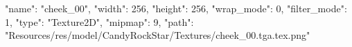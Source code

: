 {
  "name": "cheek_00",
  "width": 256,
  "height": 256,
  "wrap_mode": 0,
  "filter_mode": 1,
  "type": "Texture2D",
  "mipmap": 9,
  "path": "Resources/res/model/CandyRockStar/Textures/cheek_00.tga.tex.png"
}